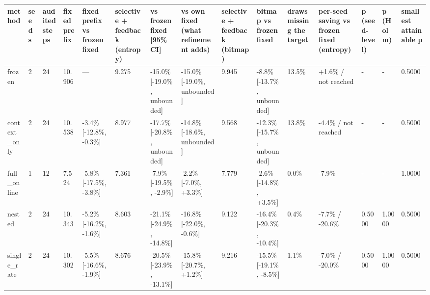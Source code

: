 \begin{tabular}{lllllllllllllll}
\hline
method & seeds & audited steps & fixed prefix & fixed prefix vs frozen fixed & selective + feedback (entropy) & vs frozen fixed [95\% CI] & vs own fixed (what refinement adds) & selective + feedback (bitmap) & bitmap vs frozen fixed & draws missing the target & per-seed saving vs frozen fixed (entropy) & p (seed-level) & p (Holm) & smallest attainable p \\
\hline
frozen & 2 & 24 & 10.906 & — & 9.275 & -15.0\% [-19.0\%, unbounded] & -15.0\% [-19.0\%, unbounded] & 9.945 & -8.8\% [-13.7\%, unbounded] & 13.5\% & +1.6\% / not reached & - & - & 0.5000 \\
context\_only & 2 & 24 & 10.538 & -3.4\% [-12.8\%, -0.3\%] & 8.977 & -17.7\% [-20.8\%, unbounded] & -14.8\% [-18.6\%, unbounded] & 9.568 & -12.3\% [-15.7\%, unbounded] & 13.8\% & -4.4\% / not reached & - & - & 0.5000 \\
full\_online & 1 & 12 & 7.524 & -5.8\% [-17.5\%, -3.8\%] & 7.361 & -7.9\% [-19.5\%, -2.9\%] & -2.2\% [-7.0\%, +3.3\%] & 7.779 & -2.6\% [-14.8\%, +3.5\%] & 0.0\% & -7.9\% & - & - & 1.0000 \\
nested & 2 & 24 & 10.343 & -5.2\% [-16.2\%, -1.6\%] & 8.603 & -21.1\% [-24.9\%, -14.8\%] & -16.8\% [-22.0\%, -0.6\%] & 9.122 & -16.4\% [-20.3\%, -10.4\%] & 0.4\% & -7.7\% / -20.6\% & 0.5000 & 1.0000 & 0.5000 \\
single\_rate & 2 & 24 & 10.302 & -5.5\% [-16.6\%, -1.9\%] & 8.676 & -20.5\% [-23.9\%, -13.1\%] & -15.8\% [-20.7\%, +1.2\%] & 9.216 & -15.5\% [-19.1\%, -8.5\%] & 1.1\% & -7.0\% / -20.0\% & 0.5000 & 1.0000 & 0.5000 \\
\hline
\end{tabular}
